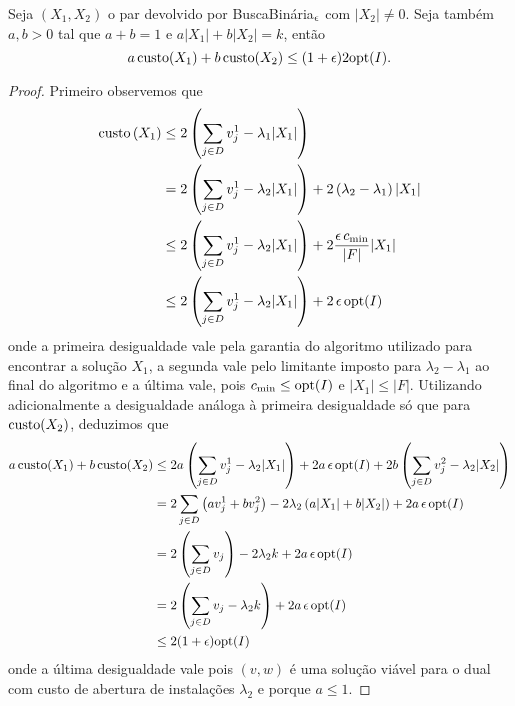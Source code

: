 \begin{lemma}
    \label{k-median_relLag_lema1}
    Seja $(X_1,X_2)$ o par devolvido por {\sc BuscaBinária}$_\epsilon$ com $|X_2| \neq 0$. Seja também $a,b > 0$ tal que $a + b = 1 $ e $a|X_1| + b|X_2| = k$, então
    \[a \, \mathrm{custo}(X_1) + b \,\mathrm{custo}(X_2) \leq (1+\epsilon) 2\mathrm{opt}(I).\]
\end{lemma}
\begin{proof}
Primeiro observemos que 
\begin{subequations}
    \begin{align*}
        \mathrm{custo}\left(X_1\right) &\leq 2\left(\sum_{j \in D} v_j^1 - \lambda_1|X_1|\right) \\
        & = 2 \left(\sum_{j \in D} v_j^1 - \lambda_2 |X_1| \right) + 2 \left(\lambda_2 - \lambda_1\right) |X_1| \\
        &\leq 2 \left(\sum_{j \in D} v_j^1 - \lambda_2 |X_1| \right) + 2\frac{\epsilon\, c_{\min}}{|F|}|X_1|  \\
        &\leq 2 \left(\sum_{j \in D} v_j^1 - \lambda_2 |X_1| \right) + 2 \, \epsilon \, \mathrm{opt}(I)
    \end{align*}
\end{subequations}
onde a primeira desigualdade vale pela garantia do algoritmo utilizado para encontrar a solução $X_1$, a segunda vale pelo limitante imposto para $\lambda_2 - \lambda_1$ ao final do algoritmo e a última vale, pois $c_{\min} \leq \mathrm{opt}(I)$ e $|X_1| \leq |F|$. Utilizando adicionalmente a desigualdade análoga à primeira desigualdade só que para $\mathrm{custo}(X_2)$, deduzimos que
\begin{subequations}
    \begin{align*}
        a \, \mathrm{custo}(X_1) + b \,\mathrm{custo}(X_2) &\leq 2a \left(\sum_{j\in D} v_j^1 - \lambda_2|X_1|\right) + 2a\, \epsilon\,\mathrm{opt}(I) + 2b\left(\sum_{j\in D} v_j^2 - \lambda_2|X_2|\right) \\
        &= 2\sum_{j \in D} \left(a v_j^1 + b v_j^2\right) - 2\lambda_2\left( a|X_1| + b|X_2|\right) + 2a\,\epsilon\,\mathrm{opt}(I)\\
        & = 2\left(\sum_{j\in D } v_j\right) - 2\lambda_2 k + 2a\,\epsilon\,\mathrm{opt}(I)\\
        & = 2\left( \sum_{j \in D } v_j -\lambda_2 k\right) + 2a\,\epsilon\,\mathrm{opt}(I) \\
        &\leq 2(1+\epsilon)\mathrm{opt}(I)
    \end{align*}
\end{subequations}
onde a última desigualdade vale pois $(v,w)$ é uma solução viável para o dual com custo de abertura de instalações $\lambda_2$ e porque $a \leq 1$.
\end{proof}

